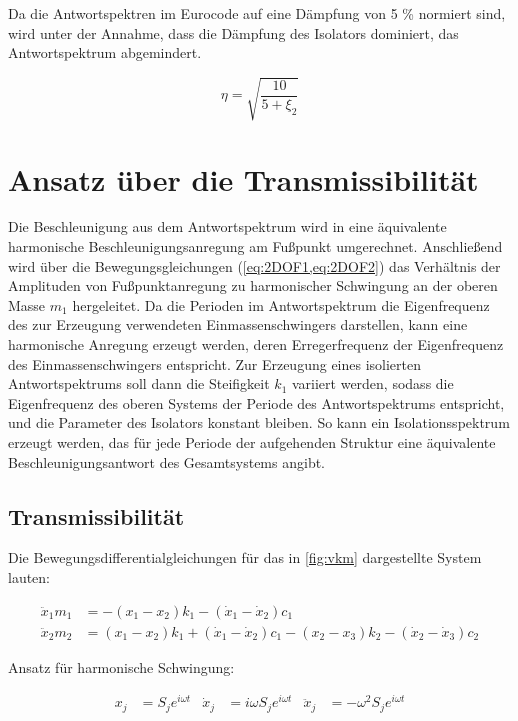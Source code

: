 Da die Antwortspektren im Eurocode auf eine Dämpfung von 5 \% normiert sind, wird unter der Annahme, dass die Dämpfung des Isolators dominiert, das Antwortspektrum abgemindert.

\begin{equation}\label{eta}
\eta = \sqrt{\frac{10}{5 + \xi_2}}
\end{equation}

\pagebreak

\section{Ansatz über die Transmissibilität}
\label{sec:ansatztrasnm}

Die Beschleunigung aus dem Antwortspektrum wird in eine äquivalente harmonische Beschleunigungsanregung am Fußpunkt umgerechnet.
Anschließend wird über die Bewegungsgleichungen (\cref{eq:2DOF1,eq:2DOF2}) das Verhältnis der Amplituden von Fußpunktanregung zu harmonischer Schwingung an der oberen Masse $m_1$ hergeleitet.
Da die Perioden im Antwortspektrum die Eigenfrequenz des zur Erzeugung verwendeten Einmassenschwingers darstellen, kann eine harmonische Anregung erzeugt werden, deren Erregerfrequenz der Eigenfrequenz des Einmassenschwingers entspricht.
Zur Erzeugung eines isolierten Antwortspektrums soll dann die Steifigkeit $k_1$ variiert werden, sodass die Eigenfrequenz des oberen Systems der Periode des Antwortspektrums entspricht, und die Parameter des Isolators konstant bleiben.
So kann ein Isolationsspektrum erzeugt werden, das für jede Periode der aufgehenden Struktur eine äquivalente Beschleunigungsantwort des Gesamtsystems angibt.

\subsection{Transmissibilität}
\label{sec:transm}

Die Bewegungsdifferentialgleichungen für das in \cref{fig:vkm} dargestellte System lauten:

\begin{align}
\ddot x_1 m_1 &= -(x_1 - x_2) k_1 -(\dot x_1 - \dot x_2) c_1 \label{eq:BewegDGL1}\\
\ddot x_2 m_2 &= (x_1 - x_2) k_1 + (\dot x_1 - \dot x_2) c_1 - (x_2 - x_3) k_2 - (\dot x_2 - \dot x_3) c_2 \label{eq:BewegDGL2}
\end{align}

Ansatz für harmonische Schwingung:

\begin{align*}
x_j &= S_j e^{i \omega t} & \dot x_j &= i \omega S_j e^{i \omega t} & \ddot x_j &= - \omega^2 S_j e^{i \omega t}
\end{align*}

